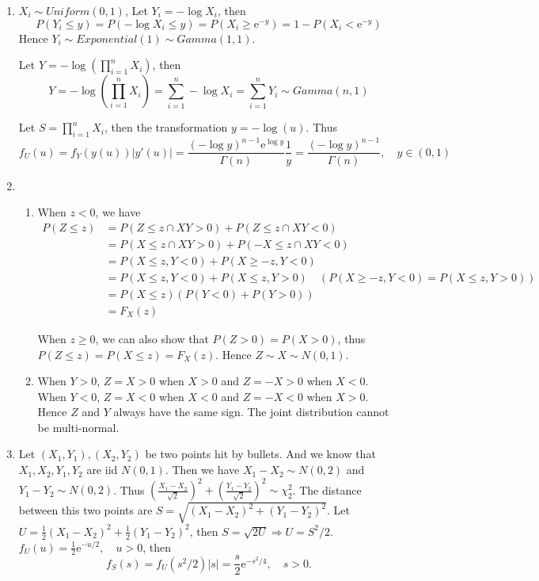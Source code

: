 \documentclass{article}
\begin{document}
\begin{enumerate}[leftmargin = 0 em, label = \arabic*., font = \bfseries]
\begin{enumerate}
\end{enumerate}

\newpage

\item 
$X_i \sim Uniform(0,1)$, Let $Y_i = -\log X_i$, then
\[P(Y_i \leq y) = P(-\log X_i \leq y) = P(X_i \geq \mathrm{e}^{-y}) = 1 - P(X_i < \mathrm{e}^{-y})\]
Hence $Y_i \sim Exponential(1) \sim Gamma(1,1)$.

Let $Y = -\log (\prod_{i = 1}^n X_i)$, then
\[Y = -\log (\prod_{i = 1}^n X_i) =  \sum_{i = 1}^n -\log X_i = \sum_{i=1}^n Y_i \sim Gamma(n,1)\]

Let $S = \prod_{i = 1}^n X_i$, then the transformation $y = -\log(u)$. Thus
\[f_U (u) = f_Y (y(u)) |y'(u)| = \frac{(- \log y)^{n-1} \mathrm{e}^{\log y}}{\Gamma(n)} \frac{1}{y} = \frac{(- \log y)^{n-1}}{\Gamma (n)}, \quad y \in (0,1)\]


\item 
\begin{enumerate}
	\item 
	When $z < 0$, we have
	\begin{align*}
	P(Z \leq z) &= P(Z \leq z \cap XY >0) + P(Z \leq z \cap XY <0)\\
	& = P(X \leq z \cap XY >0) + P(-X \leq z \cap XY <0)\\
	& = P(X \leq z , Y < 0) + P(X \geq -z , Y < 0)\\
	& = P(X \leq z , Y < 0) + P(X \leq z, Y >0) \quad (P(X \geq -z, Y <0) = P(X \leq z, Y >0))\\
	& = P(X \leq z)(P(Y < 0) + P(Y > 0))\\
	& = F_X (z)
	\end{align*}
	
	When $z \geq 0$, we can also show that $P(Z > 0) = P(X >0)$, thus $P(Z \leq z) = P(X \leq z) = F_X (z)$. Hence $Z \sim X \sim N(0,1)$.


	\item 
	When $Y > 0$, $Z = X > 0$ when $X >0$ and $Z = -X > 0$ when $X <0$. When $Y <0$, $Z = X < 0$ when $X <0$ and $Z = -X < 0 $ when $X >0$. Hence $Z$ and $Y$ always have the same sign. The joint distribution cannot be multi-normal. 

\end{enumerate}

\item 
Let $(X_1, Y_1), (X_2, Y_2)$ be two points hit by bullets. And we know that $X_1, X_2, Y_1, Y_2$ are iid $N(0,1)$. Then we have $X_1 - X_2 \sim N(0,2)$ and $Y_1 - Y_2 \sim N(0,2)$. Thus $(\frac{X_1 - X_2}{\sqrt{2}})^2 + (\frac{Y_1 - Y_2}{\sqrt{2}})^2 \sim \chi_2^2$. The distance between this two points are $S = \sqrt{(X_1 - X_2)^2 + (Y_1 - Y_2)^2}$. Let $U = \frac{1}{2} (X_1 - X_2)^2 + \frac{1}{2} (Y_1 - Y_2)^2$, then $S = \sqrt{2 U} \Rightarrow U = S^2 /2$. $f_U (u) = \frac{1}{2} \mathrm{e}^{- u /2},\quad u >0$, then
\[f_S (s) = f_U (s^2 / 2) |s| = \frac{s}{2} \mathrm{e}^{-s^2/4},\quad s >0.\]
	

\end{enumerate}
\end{document}
